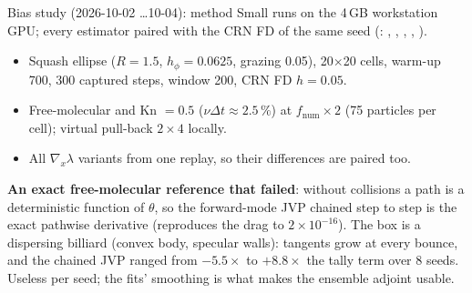 \documentclass[10pt,aspectratio=169]{beamer}
\begin{document}
\begin{frame}{Bias study (2026-10-02 \dots 10-04): method}
\small
Small runs on the 4\,GB workstation GPU; every estimator paired with the CRN FD of the same seed
(: , , , ,
).
\begin{itemize}
\item Squash ellipse ($R = 1.5$, $h_\phi = 0.0625$, grazing 0.05), 20$\times$20 cells, warm-up 700,
  300 captured steps, window 200, CRN FD $h = 0.05$.
\item Free-molecular and Kn $= 0.5$ ($\nu\Delta t\approx2.5\,\%$) at $f_{\mathrm{num}}\times2$ (75 particles
  per cell); virtual pull-back $2\times4$ locally.
\item All $\nabla_x\lambda$ variants from one replay, so their differences are paired too.
\end{itemize}
\textbf{An exact free-molecular reference that failed}: without collisions a path is a deterministic
function of $\theta$, so the forward-mode JVP chained step to step is the exact pathwise derivative
(reproduces the drag to $2\times10^{-16}$).  The box is a dispersing billiard (convex body, specular
walls): tangents grow at every bounce, and the chained JVP ranged from $-5.5\times$ to $+8.8\times$
the tally term over 8 seeds.  Useless per seed; the fits' smoothing is what makes the ensemble
adjoint usable.
\end{frame}
\end{document}
